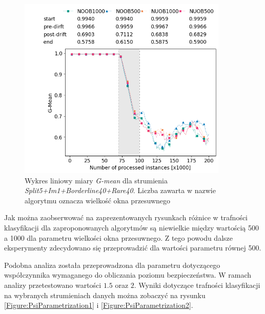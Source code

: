 \begin{figure}[h]
    \centering
    \includegraphics[width=10cm]{figures/split5im1borderline40rare40_window.png}
    \caption{Wykres liniowy miary \textit{G-mean} dla strumienia \textit{Split5+Im1+Borderline40+Rare40}. Liczba zawarta w nazwie algorytmu oznacza wielkość okna przesuwnego}\label{Figure:WindowParametrization2}
\end{figure}


\noindent Jak można zaobserwować na zaprezentowanych rysunkach różnice w trafności klasyfikacji dla zaproponowanych algorytmów są niewielkie między wartością 500 a 1000 dla parametru wielkości okna przesuwnego. Z tego powodu dalsze eksperymenty zdecydowano się przeprowadzić dla wartości parametru równej 500.

Podobna analiza została przeprowadzona dla parametru dotyczącego współczynnika wymaganego do obliczania poziomu bezpieczeństwa. W ramach analizy przetestowano wartości $1.5$ oraz $2$. Wyniki dotyczące trafności klasyfikacji na wybranych strumieniach danych można zobaczyć na rysunku \ref{Figure:PsiParametrization1} i \ref{Figure:PsiParametrization2}.

